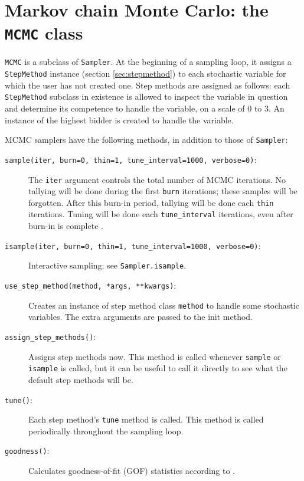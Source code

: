 \hypertarget{mcmc}{}
\section*{Markov chain Monte Carlo: the \texttt{MCMC} class} \label{sec:mcmc}
 \texttt{MCMC} is a subclass of \texttt{Sampler}. At the beginning of a sampling loop, it assigns a \texttt{StepMethod} instance (section \ref{sec:stepmethod}) to each stochastic variable for which the user has not created one. Step methods are assigned as follows: each \texttt{StepMethod} subclass in existence is allowed to inspect the variable in question and determine its competence to handle the variable, on a scale of 0 to 3. An instance of the highest bidder is created to handle the variable.

MCMC samplers have the following methods, in addition to those of \texttt{Sampler}:
\begin{description}
    \item[\texttt{sample(iter, burn=0, thin=1, tune\_interval=1000, verbose=0)}:] The \texttt{iter} argument controls the total number of MCMC iterations. No tallying will be done during the first \texttt{burn} iterations; these samples will be forgotten. After this burn-in period, tallying will be done each \texttt{thin} iterations. Tuning will be done each \texttt{tune\_interval} iterations, even after burn-in is complete \cite{tuning,Haario:2001lr}.
    \item[\texttt{isample(iter, burn=0, thin=1, tune\_interval=1000, verbose=0)}:] Interactive sampling; see \texttt{Sampler.isample}.
    \item[\texttt{use_step_method(method, *args, **kwargs)}:] Creates an instance of step method class \texttt{method} to handle some stochastic variables. The extra arguments are passed to the init method.
    \item[\texttt{assign_step_methods()}:] Assigns step methods now. This method is called whenever \texttt{sample} or \texttt{isample} is called, but it can be useful to call it directly to see what the default step methods will be.
    \item[\texttt{tune()}:] Each step method's \texttt{tune} method is called. This method is called periodically throughout the sampling loop.
    \item[\texttt{goodness()}:] Calculates goodness-of-fit (GOF) statistics according to \cite{Brooks:2000il}.
\end{description}

